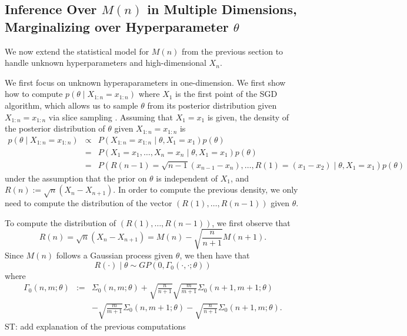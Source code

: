\documentclass[12pt,english]{article}
\newcommand{\stcomment}[1]{{\color{blue} ST: #1}}
\begin{document}
\subsection{Inference Over $M(n)$ in Multiple Dimensions, Marginalizing over Hyperparameter $\theta$}
We now extend the statistical model for $M(n)$ from the previous section to handle unknown hyperparameters and high-dimensional $X_{n}$.

We first focus on unknown hyperaparameters in one-dimension. We first show how to compute $p\left(\theta\mid X_{1:n} = x_{1:n}\right)$ where $X_{1}$ is the first point of the SGD algorithm, which allows us to sample $\theta$ from its posterior distribution given $X_{1:n} = x_{1:n}$ via slice sampling \citep{radford2003Slice}. Assuming that $X_{1}=x_{1}$ is given, the density of the posterior distribution of $\theta$ given $X_{1:n} = x_{1:n}$ is
\begin{eqnarray*}
p\left(\theta\mid X_{1:n} = x_{1:n}\right) & \propto & P\left(X_{1:n} = x_{1:n}\mid\theta,X_{1}=x_{1}\right)p\left(\theta\right)\\
 & = & P\left(X_{1}=x_{1},\ldots,X_{n}=x_{n}\mid\theta,X_{1}=x_{1}\right)p\left(\theta\right)\\
 & = & P\left(R\left(n-1\right)=\sqrt{n-1}\left(x_{n-1}-x_{n}\right),\ldots,R\left(1\right)=\left(x_{1}-x_{2}\right)\mid\theta,X_{1}=x_{1}\right)p\left(\theta\right)
\end{eqnarray*}
under the assumption that the prior on $\theta$ is independent of $X_{1}$, and $R(n):= \sqrt{n}\left(X_{n}-X_{n+1}\right)$. In order to compute the previous density, we only need to compute the distribution of the vector $(R(1),\ldots,R(n-1))$ given $\theta$. 

To compute the distribution of $(R(1),\ldots,R(n-1))$, we first observe that 
\[
R(n) = \sqrt{n}\left(X_{n}-X_{n+1}\right) = M\left(n\right)-\sqrt{\frac{n}{n+1}}M\left(n+1\right).
\]
Since $M(n)$ follows a Gaussian process given $\theta$, we then have that
\[
R(\cdot)\mid\theta\sim GP\left(0,\Gamma_{0}\left(\cdot,\cdot;\theta\right)\right)
\]
where 
\begin{eqnarray*}
\Gamma_{0}\left(n,m;\theta\right) & := & \Sigma_{0}\left(n,m;\theta\right)+\sqrt{\frac{n}{n+1}}\sqrt{\frac{m}{m+1}}\Sigma_{0}\left(n+1,m+1;\theta\right)\\
 &  & -\sqrt{\frac{m}{m+1}}\Sigma_{0}\left(n,m+1;\theta\right)-\sqrt{\frac{n}{n+1}}\Sigma_{0}\left(n+1,m;\theta\right).
\end{eqnarray*}
\stcomment{add explanation of the previous computations}
\end{document}
